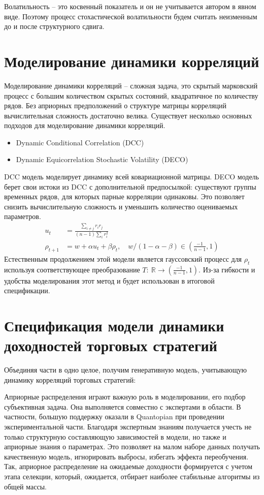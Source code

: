 Волатильность -- это косвенный показатель и он не учитывается автором в явном виде. Поэтому процесс стохастической волатильности будем считать неизменным до и после структурного сдвига.

\section{Моделирование динамики корреляций}
Моделирование динамики корреляций -- сложная задача, это скрытый марковский процесс с большим количеством скрытых состояний, квадратичное по количеству рядов. Без априорных предположений о структуре матрицы корреляций вычислительная сложность достаточно велика. Существует несколько основных подходов для моделирование динамики корреляций.
\begin{itemize}
	\item Dynamic Conditional Correlation (DCC) \citep{engle2000}
	\item Dynamic Equicorrelation Stochastic Volatility (DECO) \citep{kurose2016}
\end{itemize}
DCC модель моделирует динамику всей ковариационной матрицы. DECO модель берет свои истоки из DCC с дополнительной предпосылкой: существуют группы временных рядов, для которых парные корреляции одинаковы. Это позволяет снизить вычислительную сложность и уменьшить количество оцениваемых параметров.
\begin{align}
u_t &= \frac{\sum_{i\neq j} r_i r_j}{(n-1) \sum_{i} r_i^2}\\
\rho_{t+1} &= w + \alpha u_t + \beta \rho_t, \quad w/(1-\alpha-\beta) \in \left(\tfrac{-1}{n-1}, 1\right)
\end{align}
Естественным продолжением этой модели является гауссовский процесс для $\rho_t$ используя соответствующее преобразование $T:\: \mathbb{R} \to \left(\tfrac{-1}{n-1}, 1\right)$. Из-за гибкости и удобства моделирования этот метод и будет использован в итоговой спецификации.

\section{Спецификация модели динамики доходностей торговых стратегий}
Объединяя части в одно целое, получим генеративную модель, учитывающую динамику корреляций торговых стратегий:


Априорные распределения играют важную роль в моделировании, его подбор субъективная задача. Она выполняется совместно с экспертами в области. В частности, большую поддержку оказали в Quantopian при проведении экспериментальной части. Благодаря экспертным знаниям получается учесть не только структурную составляющую зависимостей в модели, но также и априорные знания о параметрах. Это позволяет на малом наборе данных получать качественную модель, игнорировать выбросы, избегать эффекта переобучения. Так, априорное распределение на ожидаемые доходности формируется с учетом этапа селекции, который, ожидается, отбирает наиболее стабильные алгоритмы из общей массы.

